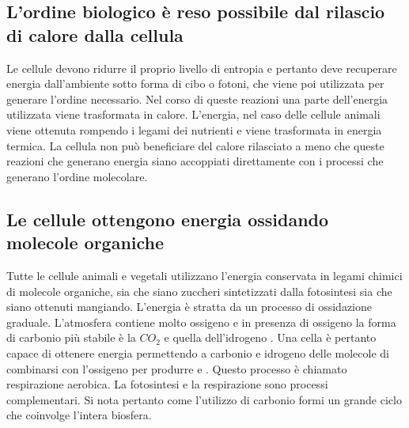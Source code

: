 \subsection{L'ordine biologico \`e reso possibile dal rilascio di calore dalla cellula}
Le cellule devono ridurre il proprio livello di entropia e pertanto deve recuperare energia dall'ambiente sotto forma di cibo o fotoni, che viene poi utilizzata per generare l'ordine
necessario. Nel corso di queste reazioni una parte dell'energia utilizzata viene trasformata in calore. L'energia, nel caso delle cellule animali viene ottenuta rompendo i legami dei 
nutrienti e viene trasformata in energia termica. La cellula non pu\`o beneficiare del calore rilasciato a meno che queste reazioni che generano energia siano accoppiati direttamente
con i processi che generano l'ordine molecolare. 
\subsection{Le cellule ottengono energia ossidando molecole organiche}
Tutte le cellule animali e vegetali utilizzano l'energia conservata in legami chimici di molecole organiche, sia che siano zuccheri sintetizzati dalla fotosintesi sia che siano ottenuti
mangiando. L'energia \`e stratta da un processo di ossidazione graduale. L'atmosfera contiene molto ossigeno e in presenza di ossigeno la forma di carbonio pi\`u stabile \`e la $CO_2$ e
quella dell'idrogeno . Una cella \`e pertanto capace di ottenere energia permettendo a carbonio e idrogeno delle molecole di combinarsi con l'ossigeno per produrre  e 
. Questo processo \`e chiamato respirazione aerobica. La fotosintesi e la respirazione sono processi complementari. Si nota pertanto come l'utilizzo di carbonio formi un grande 
ciclo che coinvolge l'intera biosfera. 
